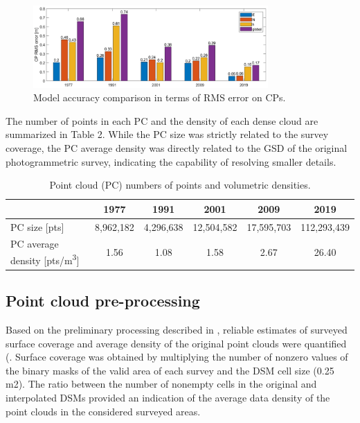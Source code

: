 {\begin{figure}
    \centering
    \includegraphics[width=0.8\textwidth]{cp_error.png}
    \caption{Model accuracy comparison in terms of RMS error on CPs. }
    \label{fig:2:cp_error}
\end{figure}

The number of points in each PC and the density of each dense cloud are summarized in Table 2.
While the PC size was strictly related to the survey coverage, the PC average density was directly related to the GSD of the original photogrammetric survey, indicating the capability of resolving smaller details.

\begin{table}
    \centering
    \caption{Point cloud (PC) numbers of points and volumetric densities.}
    \label{tab:2:pcd_density}
    \begin{tabular}{lccccc}
        \hline
        & 1977 & 1991 & 2001 & 2009 & 2019 \\
        \hline
        PC size [pts] & 8,962,182 & 4,296,638 & 12,504,582 & 17,595,703 & 112,293,439 \\
        PC average density [pts/m\textsuperscript{3}] & 1.56 & 1.08 & 1.58 & 2.67 & 26.40 \\
        \hline
    \end{tabular}
\end{table}


\subsection{Point cloud pre-processing}\label{sec:2:res_preproc}

Based on the preliminary processing described in , reliable estimates of surveyed surface coverage and average density of the original point clouds were quantified (.
Surface coverage was obtained by multiplying the number of nonzero values of the binary masks of the valid area of each survey and the DSM cell size (0.25 m2). 
The ratio between the number of nonempty cells in the original and interpolated DSMs provided an indication of the average data density of the point clouds in the considered surveyed areas. 

}
